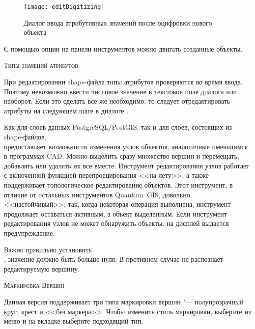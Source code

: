 \begin{figure}[ht]
   \centering
   \texttt{[image: editDigitizing]}
   \caption{Диалог ввода атрибутивных значений после оцифровки нового объекта \wincaption}\label{fig:vector_digitising}
 \end{figure}

С помощью опции  на
панели инструментов можно двигать созданные объекты.

\begin{Tip}\caption{\textsc{Типы значений атрибутов}}
При редактировании shape-файла типы атрибутов проверяются во время ввода.
Поэтому невозможно ввести числовое значение в текстовое поле диалога
 или наоборот. Если это сделать все же необходимо,
то следует отредактировать атрибуты на следующем шаге в диалоге
.
\end{Tip}


Как для слоев данных PostgreSQL/PostGIS, так и для слоев, состоящих из
shape-файлов, \\
 предоставляет
возможности изменения узлов объектов, аналогичные имеющимся в программах CAD.
Можно выделить сразу множество вершин и перемещать, добавлять или удалять
их все вместе. Инструмент редактирования узлов работает с включенной функцией
перепроецирования <<на лету>>, а также поддерживает топологическое редактирование
объектов. Этот инструмент, в отличие от остальных инструментов Quantum~GIS,
довольно <<настойчивый>>: так, когда некоторая операция выполнена, инструмент
продолжает оставаться активным, а объект выделенным. Если инструмент
редактирования узлов не может обнаружить объекты, на дисплей выдается
предупреждение.

Важно правильно установить  \arrow
{} \arrow
{} \arrow \\ , значение должно быть
больше нуля. В противном случае \qg не распознает редактируемую вершину.

\begin{Tip}\caption{\textsc{Маркировка Вершин}}
Данная версия \qg поддерживает три типа маркировки вершин "--- полупрозрачный
круг, крест и <<без маркера>>. Чтобы изменить стиль маркировки, выберите
 из меню 
и на вкладке  выберите подходящий тип.
\end{Tip}

